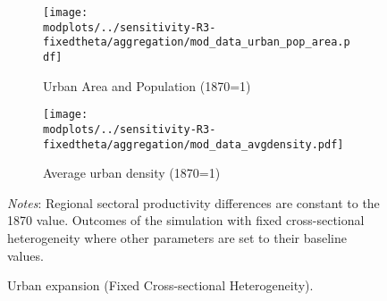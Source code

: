 \documentclass[./20250130-paper.tex]{subfiles}
\begin{document}

\begin{figure}[p!]
	\begin{adjustbox}{center}	
		\begin{subfigure}{\ptwo\textwidth}
			\texttt{[image: \\modplots/../sensitivity-R3-fixedtheta/aggregation/mod\_data\_urban\_pop\_area.pdf]}
			\caption{Urban Area and Population (1870=1)\label{fig:model-citysize-fixedcross}}
		\end{subfigure}
		\hspace{0.1cm}
		\begin{subfigure}{\ptwo\textwidth}
			\texttt{[image: \\modplots/../sensitivity-R3-fixedtheta/aggregation/mod\_data\_avgdensity.pdf]}
			\caption{Average urban density (1870=1)\label{fig:model-density-fixedcross}}
		\end{subfigure}	
	\end{adjustbox}	
	\caption{Urban expansion (Fixed Cross-sectional Heterogeneity).\label{fig:model-urbanexp-fixedcross}}
	{\footnotesize \textit{Notes}: Regional sectoral productivity differences  are constant to the 1870 value. Outcomes of the simulation with fixed cross-sectional heterogeneity where other parameters are set to their baseline values.}
\end{figure}
\end{document}
